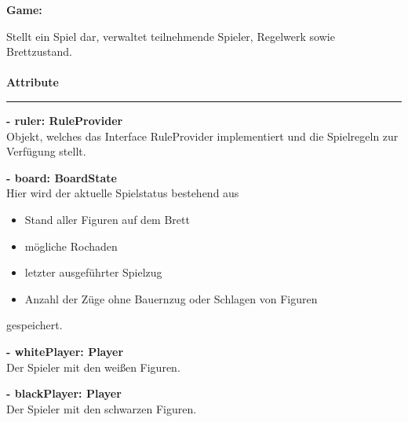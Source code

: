 \documentclass[parskip=full]{scrartcl}
\begin{document}
			\textbf{\Large{Game:}}
			
			Stellt ein Spiel dar, verwaltet teilnehmende Spieler, Regelwerk sowie Brettzustand. \\
				\\
				\textbf{\large{Attribute}}
				\newline
				\rule{\textwidth}{1pt}
				
				\begin{description}
					 \item \textbf{- ruler: RuleProvider}\\ Objekt, welches das Interface RuleProvider implementiert und die Spielregeln zur Verfügung stellt.
					 \item \textbf{- board: BoardState}\\ Hier wird der aktuelle Spielstatus bestehend aus
					 \begin{itemize}
					 
			\item Stand aller Figuren auf dem Brett
			\item mögliche Rochaden
			\item letzter ausgeführter Spielzug
			\item Anzahl der Züge ohne Bauernzug oder Schlagen von Figuren
			  \end{itemize}	
			  	 gespeichert.
					 \item \textbf{- whitePlayer: Player}\\ Der Spieler mit den weißen Figuren.
					 \item \textbf{- blackPlayer: Player}\\ Der Spieler mit den schwarzen Figuren.\\
			    \\
				\end{description} 
				
\end{document}
